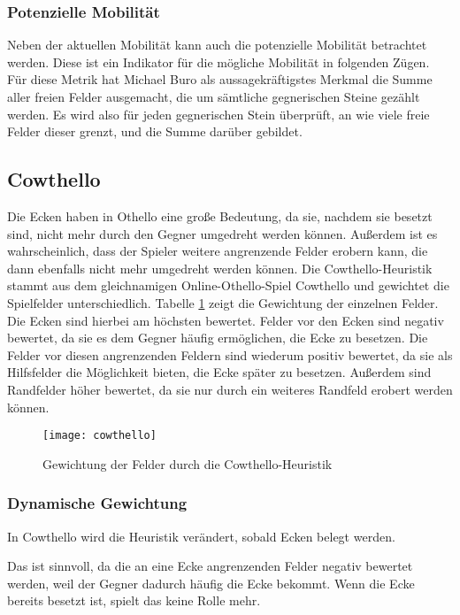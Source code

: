 \subsubsection{Potenzielle Mobilität}
\label{sec:potmobility}
Neben der aktuellen Mobilität kann auch die potenzielle Mobilität betrachtet werden. Diese ist ein Indikator für die
mögliche Mobilität in folgenden Zügen. Für diese Metrik hat Michael Buro als aussagekräftigstes Merkmal die Summe aller
freien Felder ausgemacht, die um sämtliche gegnerischen Steine gezählt werden. Es wird also für jeden gegnerischen Stein
überprüft, an wie viele freie Felder dieser grenzt, und die Summe darüber gebildet.
\cite[S.~8f.]{evaluationfunctions}

\subsection{Cowthello}
\label{sec:cowthello}
Die Ecken haben in Othello eine große Bedeutung, da sie, nachdem sie besetzt sind, nicht mehr durch den Gegner umgedreht
werden können. Außerdem ist es wahrscheinlich, dass der Spieler weitere angrenzende Felder erobern kann, die dann
ebenfalls nicht mehr umgedreht werden können. Die Cowthello-Heuristik stammt aus dem gleichnamigen Online-Othello-Spiel
Cowthello und gewichtet die Spielfelder unterschiedlich.
\cite{cowthello}
Tabelle \ref{fig:cowthello} zeigt die Gewichtung der einzelnen Felder. Die Ecken sind hierbei am höchsten bewertet.
Felder vor den Ecken sind negativ bewertet, da sie es dem Gegner häufig ermöglichen, die Ecke zu besetzen. Die Felder
vor diesen angrenzenden Feldern sind wiederum positiv bewertet, da sie als Hilfsfelder die Möglichkeit bieten, die Ecke
später zu besetzen. Außerdem sind Randfelder höher bewertet, da sie nur durch ein weiteres Randfeld erobert werden
können.

\begin{figure}[H]
    \centering
    \texttt{[image: cowthello]}
    \caption{Gewichtung der Felder durch die Cowthello-Heuristik}
    \label{fig:cowthello}
\end{figure}

\subsubsection{Dynamische Gewichtung}
In Cowthello wird die Heuristik verändert, sobald Ecken belegt werden.
\cite{cowthello}

Das ist sinnvoll, da die an eine Ecke angrenzenden Felder negativ bewertet werden, weil der Gegner dadurch häufig die
Ecke bekommt. Wenn die Ecke bereits besetzt ist, spielt das keine Rolle mehr.
